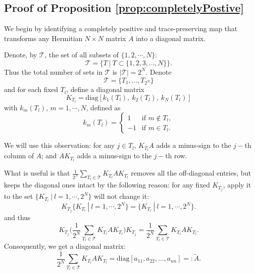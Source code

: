 \documentclass{article}
\numberwithin{equation}{section}
\begin{document}
\subsection{Proof of Proposition \ref{prop:completelyPostive}}\label{sub:completePo}
We begin by identifying a completely positive and trace-preserving map that transforms any Hermitian $N \times N$ matrix $A$ into a diagonal matrix.

Denote, by $\mathcal{T}$, the set of all subsets of $\{1,2,\cdots,N\}:$ 
\[
\mathcal{T} = \Big\{ T \ \Big|\ T \subset \{1, 2, 3, \dots, N\} \Big\}.
\]
Thus the total number of sets in $\mathcal{T}$ is $|\mathcal{T}| = 2^N$. Denote 
\begin{equation}\label{def:MathcalT}
\mathcal{T} = \{T_1, \dots, T_{2^N}\}
\end{equation}
 and for each fixed $T_{l}$, define a diagonal matrix
\begin{equation*}
K_{T_l} = \text{diag}[ k_{1}(T_l), \ k_{2}(T_{l}),\ k_{N}(T_{l})]
\end{equation*}
with $k_{m}(T_l)$, $m=1,\cdots,N$, defined as
\[
k_{m}(T_l) = 
\begin{cases} 
1 & \text{if } m \notin T_l ,\\ 
-1 & \text{if } m \in T_l.
\end{cases}
\]

We will use this observation: for any $j\in T_{l}$, $K_{T_{l}}A$ adds a minus-sign to the $j-$th column of $A$; and $A K_{T_{l}}$ adds a minus-sign to the $j-$th row. 

What is useful is that $\frac{1}{2^N} \sum_{T_l \in \mathcal{T}} K_{T_l} A K_{T_l}$ removes all the off-diagonal entries, but keeps the diagonal ones intact by the following reason: for any fixed $K_{T_j}$, apply it to the set $\big\{K_{T_{l}}\ |\ l=1,\cdots, 2^{N}\big\}$ will not change it:
\begin{equation*}
  K_{T_j} \big\{K_{T_{l}}\ |\ l=1,\cdots, 2^{N}\big\}=\big\{K_{T_{l}}\ |\ l=1,\cdots, 2^{N}\big\}.
\end{equation*} and thus
\begin{equation*}
  K_{T_j}\Big(\frac{1}{2^N} \sum_{T_l \in \mathcal{T}} K_{T_l} A K_{T_l}\Big) K_{T_j}=\frac{1}{2^N} \sum_{T_l \in \mathcal{T}} K_{T_l} A K_{T_l}.
\end{equation*}
Consequently, we get a diagonal matrix:
\begin{equation}\label{eq:diago}
\frac{1}{2^N} \sum_{T_l \in \mathcal{T}} K_{T_l} A K_{T_l} = \text{diag}[a_{11}, a_{22}, \dots, a_{nn}] =: \tilde{A}.
\end{equation}
\end{document}
